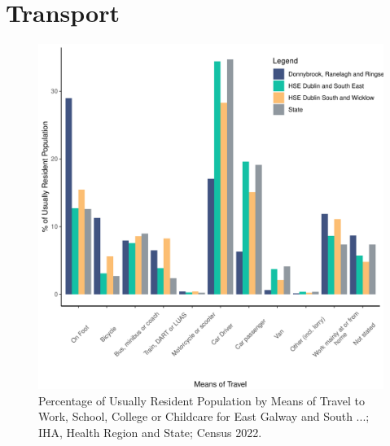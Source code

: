 \documentclass{article}
\begin{document}
\section{Transport}\label{sect:Trans}
\begin{figure}[H]
	\centering
	\includegraphics[width = 120mm]{../figures/TravelED.pdf}
	\caption{Percentage of Usually Resident Population by Means of Travel to Work, School, College or Childcare for East Galway and South ...; IHA, Health Region and State; Census 2022.}
	\label{fig:vbnv}
	\end{figure}
\end{document}
